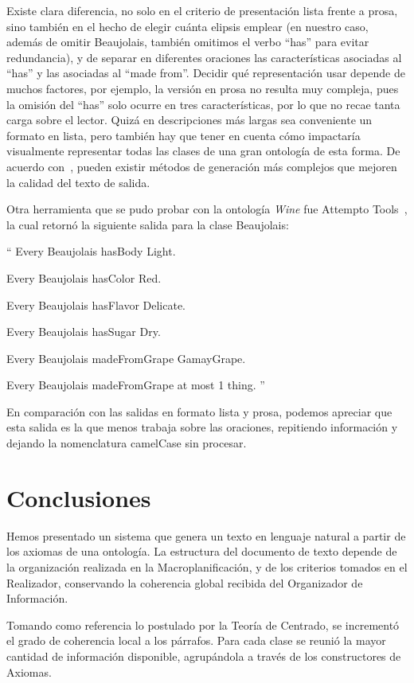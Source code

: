 Existe clara diferencia, no solo en el criterio de presentación lista frente a prosa, sino también en el hecho de elegir cuánta elipsis emplear (en nuestro caso, además de omitir Beaujolais, también omitimos el verbo ``has'' para evitar redundancia), y de separar en diferentes oraciones las características asociadas al ``has'' y las asociadas al ``made from''. Decidir qué representación usar depende de muchos factores, por ejemplo, la versión en prosa no resulta muy compleja, pues la omisión del ``has'' solo ocurre en tres características, por lo que no recae tanta carga sobre el lector. Quizá en descripciones más largas sea conveniente un formato en lista, pero también hay que tener en cuenta cómo impactaría visualmente representar todas las clases de una gran ontología de esta forma. De acuerdo con~\cite{hewlett2005effective}, pueden existir métodos de generación más complejos que mejoren la calidad del texto de salida.

Otra herramienta que se pudo probar con la ontología \emph{Wine} fue Attempto Tools~\cite{attempto}, la cual retornó la siguiente salida para la clase Beaujolais:

``
Every Beaujolais hasBody Light.

Every Beaujolais hasColor Red.

Every Beaujolais hasFlavor Delicate.

Every Beaujolais hasSugar Dry.

Every Beaujolais madeFromGrape GamayGrape.

Every Beaujolais madeFromGrape at most 1 thing.
''

En comparación con las salidas en formato lista y prosa, podemos apreciar que esta salida es la que menos trabaja sobre las oraciones, repitiendo información y dejando la nomenclatura camelCase sin procesar.

\section{Conclusiones}
Hemos presentado un sistema que genera un texto en lenguaje natural a partir de los axiomas de una ontología. La estructura del documento de texto depende de la organización realizada en la Macroplanificación, y de los criterios tomados en el Realizador, conservando la coherencia global recibida del Organizador de Información. 

Tomando como referencia lo postulado por la Teoría de Centrado,%
se incrementó el grado de coherencia local a los párrafos. Para cada clase se reunió la mayor cantidad de información disponible, agrupándola a través de los constructores de Axiomas.

